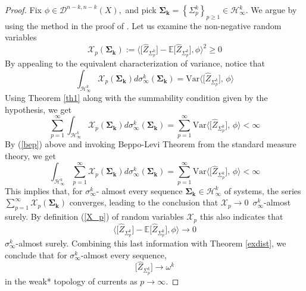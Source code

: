 \documentclass[11pt,leqno,oneside]{amsart}
\numberwithin{equation}{section}
\begin{document}
\begin{proof}
	Fix $\phi \in \mathcal{D}^{n-k, n-k}(X),$ and pick $\mathbf{\Sigma_{k}}=\left \{ \Sigma_{p}^{k} \right \} _{p\geq 1} \in \mathcal{H}_{\infty}^{k}$. We argue by using the method in the proof of \cite[Corollary 1.3]{Shif}. Let us examine the non-negative random variables
	\begin{equation}\label{X_p}
		\mathcal{X}_{p}(\mathbf{\Sigma_{k}}):=\big \langle \big[\widehat{Z}_{\Sigma_{p}^{k}}\big] - \mathbb{E}\big[\widehat{Z}_{\Sigma_{p}^{k}}\big] , \phi  \big\rangle ^{2}\geq 0
	\end{equation}
	By appealing to the equivalent characterization of variance, notice that
	\begin{equation}\label{bep}
		\int_{\mathcal{H}_{\infty}^{k}}\mathcal{X}_{p}(\mathbf{\Sigma_{k}})d\sigma_{\infty}^{k}(\mathbf{\Sigma_{k}})=
		 \mathrm{Var}\big\langle \big[\widehat{Z}_{\Sigma_{p}^{k}}\big], \, \phi \big\rangle
	\end{equation}
	Using Theorem \ref{th1} along with the summability condition given by the hypothesis, we get
   \begin{equation}
		\sum_{p=1}^{\infty} \int_{\mathcal{H}_{\infty}^{k}}\mathcal{X}_{p}(\mathbf{\Sigma_{k}})d\sigma_{\infty}^{k}(\mathbf{\Sigma_{k}})= \sum_{p=1}^{\infty}  \mathrm{Var} \big\langle \big[\widehat{Z}_{\Sigma_{p}^{k}}\big], \, \phi \big\rangle< \infty
	\end{equation}
	By (\ref{bep}) above and invoking Beppo-Levi Theorem from the standard measure theory, we get
	\begin{equation}
		\int_{\mathcal{H}_{\infty}^{k}}\sum_{p=1}^{\infty} \mathcal{X}_{p}(\mathbf{\Sigma_{k}})d\sigma_{\infty}^{k}(\mathbf{\Sigma_{k}}) =  \sum_{p=1}^{\infty}  \mathrm{Var} \big\langle \big[\widehat{Z}_{\Sigma_{p}^{k}}\big], \, \phi \big\rangle < \infty
	\end{equation}
	This implies that, for $\sigma_{\infty}^{k}$- almost every sequence $\mathbf{\Sigma_{k}} \in \mathcal{H}_{\infty}^{k}$ of systems, the series $\sum_{p=1}^{\infty}\mathcal{X}_{p}(\mathbf{\Sigma_{k}})$ converges, leading to the conclusion that $\mathcal{X}_{p}\rightarrow 0$\, $\sigma_{\infty}^{k}$-almost surely. By definition (\ref{X_p}) of random variables $\mathcal{X}_{p}$ this also indicates that
	\begin{equation}
	\big \langle \big[\widehat{Z}_{\Sigma_{p}^{k}}\big] - \mathbb{E}\big[\widehat{Z}_{\Sigma_{p}^{k}}\big] , \phi  \big\rangle \rightarrow 0
		\end{equation}
$\sigma_{\infty}^{k}$-almost surely. Combining  this last information with Theorem \ref{exdist}, we conclude that for $\sigma_{\infty}^{k}$-almost every sequence,
\begin{equation}
	\big[\widehat{Z}_{\Sigma_{p}^{k}}\big]\longrightarrow \omega^k
\end{equation}
in the weak* topology of currents as $p\rightarrow \infty$.
\end{proof}
\end{document}
